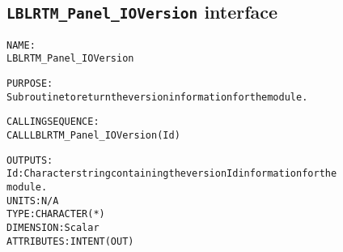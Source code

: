\subsection{\texttt{LBLRTM\_Panel\_IOVersion} interface}
  \label{sec:LBLRTM_Panel_IOVersion_interface}
  \begin{alltt}
 
  NAME:
        LBLRTM_Panel_IOVersion
 
  PURPOSE:
        Subroutine to return the version information for the module.
 
  CALLING SEQUENCE:
        CALL LBLRTM_Panel_IOVersion( Id )
 
  OUTPUTS:
        Id:     Character string containing the version Id information for the
                module.
                UNITS:      N/A
                TYPE:       CHARACTER(*)
                DIMENSION:  Scalar
                ATTRIBUTES: INTENT(OUT)
 
  \end{alltt}
